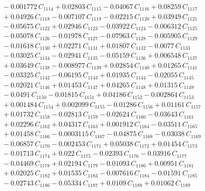 \documentclass[a4paper,11pt]{article}
\begin{document}
\begin{align}
&\quad - 0.001772\,C_{1114} + 0.02803\,C_{1115} - 0.04067\,C_{1116} + 0.08259\,C_{1117} \nonumber\\
&\quad + 0.04926\,C_{1118} - 0.007107\,C_{1119} - 0.02215\,C_{1120} + 0.03949\,C_{1121} \nonumber\\
&\quad - 0.05675\,C_{1122} + 0.02946\,C_{1123} - 0.03922\,C_{1124} - 0.006312\,C_{1125} \nonumber\\
&\quad - 0.05078\,C_{1126} - 0.01978\,C_{1127} - 0.07963\,C_{1128} - 0.005905\,C_{1129} \nonumber\\
&\quad - 0.01618\,C_{1130} + 0.02271\,C_{1131} + 0.01807\,C_{1132} - 0.0077\,C_{1133} \nonumber\\
&\quad - 0.03025\,C_{1134} - 0.02941\,C_{1135} - 0.05159\,C_{1136} + 0.006548\,C_{1137} \nonumber\\
&\quad + 0.03649\,C_{1138} - 0.008977\,C_{1139} + 0.02854\,C_{1140} + 0.01265\,C_{1141} \nonumber\\
&\quad - 0.03325\,C_{1142} - 0.06195\,C_{1143} + 0.01935\,C_{1144} - 0.02055\,C_{1145} \nonumber\\
&\quad - 0.02021\,C_{1146} + 0.01453\,C_{1147} + 0.04265\,C_{1148} + 0.01315\,C_{1149} \nonumber\\
&\quad - 0.0491\,C_{1150} - 0.01815\,C_{1151} + 0.04186\,C_{1152} - 0.002864\,C_{1153} \nonumber\\
&\quad + 0.001484\,C_{1154} + 0.002099\,C_{1155} - 0.01286\,C_{1156} + 0.01161\,C_{1157} \nonumber\\
&\quad + 0.01732\,C_{1158} - 0.02813\,C_{1159} - 0.02624\,C_{1160} - 0.03643\,C_{1161} \nonumber\\
&\quad + 0.02296\,C_{1162} + 0.04317\,C_{1163} + 0.001912\,C_{1164} - 0.03511\,C_{1165} \nonumber\\
&\quad + 0.01458\,C_{1166} - 0.0003115\,C_{1167} - 0.04875\,C_{1168} - 0.03038\,C_{1169} \nonumber\\
&\quad - 0.06857\,C_{1170} - 0.002453\,C_{1171} + 0.05038\,C_{1172} + 0.01454\,C_{1173} \nonumber\\
&\quad - 0.01713\,C_{1174} + 0.022\,C_{1175} - 0.02393\,C_{1176} - 0.03916\,C_{1177} \nonumber\\
&\quad - 0.04469\,C_{1178} + 0.02194\,C_{1179} - 0.01093\,C_{1180} + 0.00951\,C_{1181} \nonumber\\
&\quad + 0.02025\,C_{1182} + 0.01535\,C_{1183} - 0.007616\,C_{1184} - 0.01591\,C_{1185} \nonumber\\
&\quad - 0.02743\,C_{1186} - 0.05334\,C_{1187} + 0.0109\,C_{1188} + 0.01062\,C_{1189} \nonumber\\

\end{align}
\end{document}
